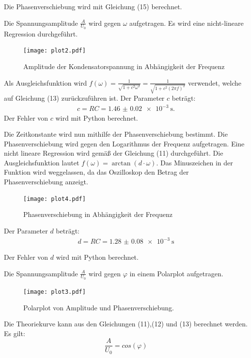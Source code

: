 Die Phasenverschiebung wird mit Gleichung (15) berechnet.

Die Spannungsamplitude $\frac{A}{U_0}$ wird gegen $\omega$ aufgetragen. Es wird eine nicht-lineare
Regression durchgeführt.

\begin{figure}[H]
  \centering
  \texttt{[image: plot2.pdf]}
  \caption{Amplitude der Kondensatorspannung in Abhängigkeit der Frequenz}
  \label{fig:amplitude}
\end{figure}

Als Ausgleichsfunktion wird $f(\omega) = \frac{1}{\sqrt{1 + c^2 \omega^2}} = \frac{1}{\sqrt{1 + c^2 (2\pi f)^2}}$ verwendet, welche auf Gleichung (13)
zurückzuführen ist.
Der Parameter $c$ beträgt:
\begin{align*}
  c = RC = \SI{1.46(2)e-3}{\second}.
\end{align*}
Der Fehler von $c$ wird mit Python berechnet.

Die Zeitkonstante wird nun mithilfe der Phasenverschiebung bestimmt. Die Phasenverschiebung wird gegen
den Logarithmus der Frequenz aufgetragen. Eine nicht lineare Regression wird gemäß der Gleichung (11) durchgeführt.
Die Ausgleichsfunktion lautet $f(\omega) = \arctan(d \cdot \omega)$. Das Minuszeichen in der Funktion wird
weggelassen, da das Oszilloskop den Betrag der Phasenverschiebung anzeigt.

\begin{figure}[H]
  \centering
  \texttt{[image: plot4.pdf]}
  \caption{Phasenverschiebung in Abhängigkeit der Frequenz}
  \label{fig:phasenverschiebung}
\end{figure}

Der Parameter $d$ beträgt:
\begin{align*}
  d = RC = \SI{1.28(8)e-3}{\second}
\end{align*}

Der Fehler von $d$ wird mit Python berechnet.

Die Spannungsamplitude $\frac{A}{U_0}$ wird gegen $\varphi$ in einem Polarplot aufgetragen.

\begin{figure}[H]
  \centering
  \texttt{[image: plot3.pdf]}
  \caption{Polarplot von Amplitude und Phasenverschiebung.}
  \label{fig:Polarplot}
\end{figure}

Die Theoriekurve kann aus den Gleichungen (11),(12) und (13) berechnet werden.
Es gilt:
\begin{equation}
  \frac{A}{U_0} = cos(\varphi)
\end{equation}

